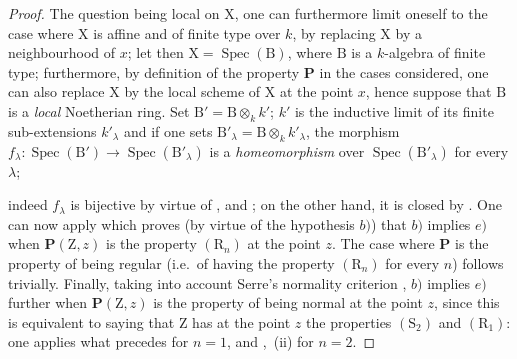 \begin{proof}
The question being local on $\mathrm{X}$, one can furthermore limit oneself to the case where $\mathrm{X}$ is affine and of finite type over $k$, by replacing $\mathrm{X}$ by a neighbourhood of $x$; let then $\mathrm{X}=\operatorname{Spec}(\mathrm{B})$, where $\mathrm{B}$ is a $k$-algebra of finite type; furthermore, by definition of the property $\boldsymbol{P}$ in the cases considered, one can also replace $\mathrm{X}$ by the local scheme of $\mathrm{X}$ at the point $x$, hence suppose that $\mathrm{B}$ is a \emph{local} Noetherian ring. Set $\mathrm{B}'=\mathrm{B}\otimes_k k'$; $k'$ is the inductive limit of its finite sub-extensions $k'_\lambda$ and if one sets $\mathrm{B}'_\lambda=\mathrm{B}\otimes_k k'_\lambda$, the morphism $f_\lambda:\operatorname{Spec}(\mathrm{B}')\to\operatorname{Spec}(\mathrm{B}'_\lambda)$ is a \emph{homeomorphism} over $\operatorname{Spec}(\mathrm{B}'_\lambda)$ for every $\lambda$;


indeed $f_\lambda$ is bijective by virtue of ,  and ; on the other hand, it is closed by . One can now apply  which proves (by virtue of the hypothesis $b)$) that $b)$ implies $e)$ when $\boldsymbol{P}(\mathrm{Z},z)$ is the property $(\mathrm{R}_n)$ at the point $z$. The case where $\boldsymbol{P}$ is the property of being regular (i.e.\ of having the property $(\mathrm{R}_n)$ for every $n$) follows trivially. Finally, taking into account Serre's normality criterion , $b)$ implies $e)$ further when $\boldsymbol{P}(\mathrm{Z},z)$ is the property of being normal at the point $z$, since this is equivalent to saying that $\mathrm{Z}$ has at the point $z$ the properties $(\mathrm{S}_2)$ and $(\mathrm{R}_1)$: one applies what precedes for $n=1$, and ,~(ii) for $n=2$.
\end{proof}

